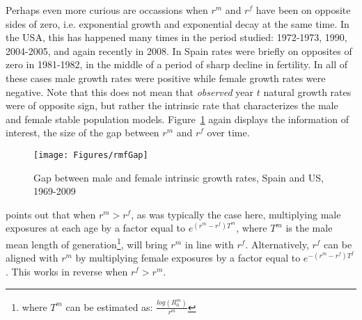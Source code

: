 Perhaps even more curious are occassions when $r^m$ and $r^f$ have been on
opposite sides of zero, i.e. exponential growth and exponential decay at the
same time. In the USA, this has happened many times in the period studied:
1972-1973, 1990, 2004-2005, and again recently in 2008. In Spain rates were 
briefly on opposites of zero in 1981-1982, in the middle of a period of sharp
decline in fertility. In all of these cases male growth rates were positive
while female growth rates were negative. Note that this does not mean that 
\textit{observed} year $t$ natural growth rates were of opposite sign, but
rather the intrinsic rate that characterizes the male and female stable
population models. Figure~\ref{fig:rmfGap} again displays the information of
interest, the size of the gap between $r^m$ and $r^f$ over time.

\begin{figure}[ht!]
        \centering  
          \caption{Gap between male and female intrinsic growth rates, Spain and
          US, 1969-2009}
           \texttt{[image: Figures/rmfGap]}
          \label{fig:rmfGap}
\end{figure}

\citet[p. 57]{coale1972growth} points out that when $r^m > r^f$, as was
typically the case here, multiplying male exposures at each age by a factor equal to
$e^{(r^m - r^f)T^m}$, where $T^m$ is the male mean length of
generation\footnote{where $T^m$ can be estimated as:
$\frac{log(R_0^m)}{r^m}$}, will bring $r^m$ in line with $r^f$. Alternatively,
$r^f$ can be aligned with $r^m$ by multiplying female exposures by a factor equal
 to $e^{-(r^m - r^f)T^f}$. This works in reverse when $r^f > r^m$.

 \FloatBarrier
